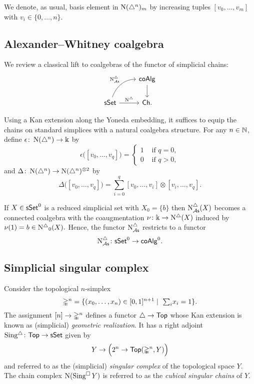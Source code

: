 We denote, as usual, basis element in $\operatorname{N}(\triangle^n)_m$ by increasing tuples $[v_0, \dots, v_m]$ with $v_i \in \{0, \dots, n\}$.

\subsection{Alexander--Whitney coalgebra} \label{ss:aw coalgebra}

We review a classical lift to coalgebras of the functor of simplicial chains:
\begin{equation*}
\begin{tikzcd}
& \coAlg \arrow[d] \\
\sSet \arrow[r, "\schains"] \arrow[ur, "\schainsAS", out=70, in=180] & \Ch.
\end{tikzcd}
\end{equation*}

Using a Kan extension along the Yoneda embedding, it suffices to equip the chains on standard simplices with a natural coalgebra structure.
For any $n \in \mathbb{N}$, define $\epsilon  \colon \operatorname{N}(\triangle^n) \to \Bbbk$ by
\begin{equation*}
\epsilon \big( [v_0, \dots, v_q] \big) = \begin{cases} 1 & \text{ if } q = 0, \\ 0 & \text{ if } q>0, \end{cases}
\end{equation*}
and $\Delta \colon \operatorname{N}(\triangle^n) \to \operatorname{N}(\triangle^n)^{\otimes2}$ by
\begin{equation*}
\Delta \big( [v_0, \dots, v_q] \big) = \sum_{i=0}^q [v_0, \dots, v_i] \otimes [v_i, \dots, v_q].
\end{equation*}

If $X \in \mathsf{sSet}^0$ is a reduced simplicial set with $X_0=\{b\}$ then $\operatorname{N^{\triangle}_{{\mathcal{A}\mathsf{s}}}}(X)$ becomes a connected coalgebra with the coaugmentation $\nu \colon \Bbbk \to \operatorname{N^{\triangle}}(X)$ induced by $\nu(1)=b \in\operatorname{N^{\triangle}}_0(X).$ Hence, the functor $\operatorname{N^{\triangle}_{{\mathcal{A}\mathsf{s}}}}$ restricts to a functor
$$\operatorname{N^{\triangle}_{{\mathcal{A}\mathsf{s}}}} \colon \mathsf{sSet}^0 \to \mathsf{coAlg}^0.$$

\subsection{Simplicial singular complex}

Consider the topological $n$-simplex
\begin{equation*}
\mathbb{\Delta}^{n} = \{(x_0, \dots, x_n) \in [0,1]^{n+1} \mid \ \textstyle{\sum}_i x_i = 1\}.
\end{equation*}
The assignment $[n] \to \mathbb{\Delta}^n$ defines a functor $\triangle \to \mathsf{Top}$ whose Kan extension is known as (simplicial) \textit{geometric realization}.
It has a right adjoint $\operatorname{Sing^{\triangle}} \colon \mathsf{Top} \to \mathsf{sSet}$ given by
\begin{equation*}
Y \to \Big( 2^n \to \mathsf{Top}(\mathbb{\Delta}^n, Y) \Big)
\end{equation*}
and referred to as the (simplicial) \textit{singular complex} of the topological space $Y$.
The chain complex $\operatorname{N}(\operatorname{Sing^{\square}} Y)$ is referred to as the \textit{cubical singular chains} of $Y$.


